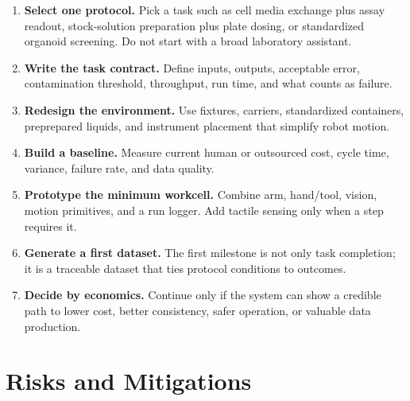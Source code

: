 \documentclass[11pt]{article}
\begin{document}
\begin{enumerate}
  \item \textbf{Select one protocol.} Pick a task such as cell media exchange plus assay readout, stock-solution preparation plus plate dosing, or standardized organoid screening. Do not start with a broad laboratory assistant.
  \item \textbf{Write the task contract.} Define inputs, outputs, acceptable error, contamination threshold, throughput, run time, and what counts as failure.
  \item \textbf{Redesign the environment.} Use fixtures, carriers, standardized containers, preprepared liquids, and instrument placement that simplify robot motion.
  \item \textbf{Build a baseline.} Measure current human or outsourced cost, cycle time, variance, failure rate, and data quality.
  \item \textbf{Prototype the minimum workcell.} Combine arm, hand/tool, vision, motion primitives, and a run logger. Add tactile sensing only when a step requires it.
  \item \textbf{Generate a first dataset.} The first milestone is not only task completion; it is a traceable dataset that ties protocol conditions to outcomes.
  \item \textbf{Decide by economics.} Continue only if the system can show a credible path to lower cost, better consistency, safer operation, or valuable data production.
\end{enumerate}

\section{Risks and Mitigations}
\end{document}
